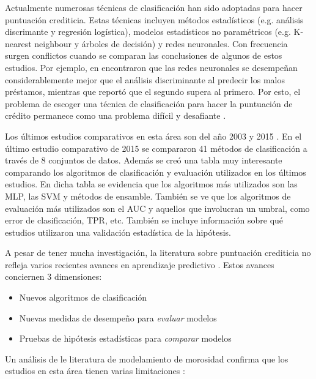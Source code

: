 Actualmente numerosas técnicas de clasificación han sido adoptadas para hacer puntuación crediticia. Estas técnicas incluyen métodos estadísticos (e.g. análisis discrimante y regresión logística), modelos estadísticos no paramétricos (e.g. K-nearest neighbour y árboles de decisión) y redes neuronales. Con frecuencia surgen conflictos cuando se comparan las conclusiones de algunos de estos estudios. Por ejemplo, en \cite{desai1996comparison} encontraron que las redes neuronales se desempeñan considerablemente mejor que el análisis discriminante al predecir los malos préstamos, mientras que \cite{yobas2000credit} reportó que el segundo supera al primero. Por esto, el problema de escoger una técnica de clasificación para hacer la puntuación de crédito permanece como una problema difícil y desafiante \cite{baesens2003benchmarking}.

Los últimos estudios comparativos en esta área son del año 2003 \cite{baesens2003benchmarking} y 2015 \cite{lessmann2015benchmarking}. En el último estudio comparativo de 2015 se compararon 41 métodos de clasificación a través de 8 conjuntos de datos. Además se creó una tabla muy interesante comparando los algoritmos de clasificación y evaluación utilizados en los últimos estudios. En dicha tabla se evidencia que los algoritmos más utilizados son las \ac{MLP}, las \ac{SVM} y métodos de ensamble. También se ve que los algoritmos de evaluación más utilizados son el \ac{AUC} y aquellos que involucran un umbral, como error de clasificación, \ac{TPR}, etc. También se incluye información sobre qué estudios utilizaron una validación estadística de la hipótesis.

A pesar de tener mucha investigación, la literatura sobre puntuación crediticia no refleja varios recientes avances en aprendizaje predictivo \cite{lessmann2015benchmarking}. Estos avances conciernen 3 dimensiones:

\begin{itemize}
    \item Nuevos algoritmos de clasificación
    \item Nuevas medidas de desempeño para \textit{evaluar} modelos
    \item Pruebas de hipótesis estadísticas para \textit{comparar} modelos 
\end{itemize}

Un análisis de le literatura de modelamiento de morosidad confirma que los estudios en esta área tienen varias limitaciones \cite{lessmann2015benchmarking}:


